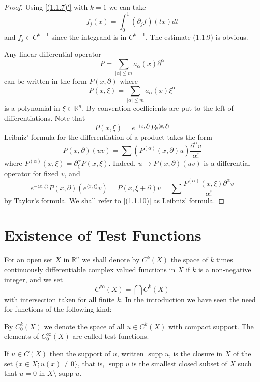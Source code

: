 \begin{proof}
    Using \eqref{(1.1.7)'} with $k=1$ we can take
\[
	f_{j}(x)=\int_{0}^{1}\left(\partial_{j} f\right)(t x) d t
\]
and $f_{j} \in C^{k-1}$ since the integrand is in $C^{k-1}$. The estimate (1.1.9) is obvious.

Any linear differential operator
\[
	P=\sum_{|\alpha| \leqq m} a_{\alpha}(x) \partial^{\alpha}
\]
can be written in the form $P(x, \partial)$ where
\[
	P(x, \xi)=\sum_{|\alpha| \leqq m} a_{\alpha}(x) \xi^{\alpha}
\]
is a polynomial in $\xi \in \mathbb{R}^{n}$. By convention coefficients are put to the left of differentiations. Note that
\[
	P(x, \xi)=e^{-\langle x, \xi\rangle} P e^{\langle x, \xi\rangle}
\]
Leibniz' formula for the differentiation of a product takes the form
\begin{equation}
    \label{(1.1.10)}
	P(x, \partial)(u v)=\sum\left(P^{(\alpha)}(x, \partial) u\right) \frac{\partial^{\alpha} v}{\alpha !}
\end{equation}
where $P^{(\alpha)}(x, \xi)=\partial_{\xi}^{\alpha} P(x, \xi)$. Indeed, $u \rightarrow P(x, \partial)(u v)$ is a differential operator for fixed $v$, and
\[
	e^{-\langle x, \xi\rangle} P(x, \partial)\left(e^{\langle x, \xi\rangle} v\right)=P(x, \xi+\partial) v=\sum \frac{P^{(\alpha)}(x, \xi) \partial^{\alpha} v}{\alpha !}
\]
by Taylor's formula. We shall refer to \eqref{(1.1.10)} as Leibniz' formula.
\end{proof}

\section{Existence of Test Functions}
For an open set $X$ in $\mathbb{R}^{n}$ we shall denote by $C^{k}(X)$ the space of $k$ times continuously differentiable complex valued functions in $X$ if $k$ is a non-negative integer, and we set
\[
	C^{\infty}(X)=\bigcap C^{k}(X)
\]
with intersection taken for all finite $k$. In the introduction we have seen the need for functions of the following kind:
\begin{defi}
    By $C_{0}^{k}(X)$ we denote the space of all $u \in C^{k}(X)$ with compact support. The elements of $C_{0}^{\infty}(X)$ are called test functions.
\end{defi}
\begin{defi}
    If $u \in C(X)$ then the support of $u$, written $\operatorname{supp} u$, is the closure in $X$ of the set $\{x \in X ; u(x) \neq 0\}$, that is, $\operatorname{supp} u$ is the smallest closed subset of $X$ such that $u=0$ in $X \setminus \operatorname{supp} u$.
\end{defi}

